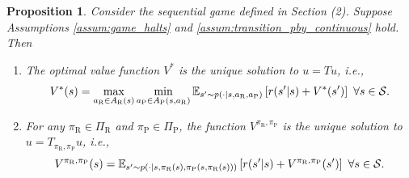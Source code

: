 \documentclass[aoas]{imsart}
\theoremstyle{plain}
\newtheorem{proposition}[theorem]{Proposition}
\theoremstyle{definition}
\begin{document}
       \begin{proposition}
           \label{lem:bellman_equations}
           Consider the sequential game defined in Section (2). Suppose Assumptions \ref{assum:game_halts} and \ref{assum:transition_pby_continuous} hold. Then
           \begin{enumerate}%
               \item The optimal value function $V^*$ is the unique solution to $u = Tu$, i.e., 
           \begingroup
           \allowdisplaybreaks
           \begin{equation}
               \label{eqn:bellman_equation}
               V^*(s) = \max_{a_\text{R} \in A_\text{R}(s)}\min_{a_\text{P} \in A_\text{P}(s,a_\text{R})}\mathbb{E}_{s' \sim p(\cdot|s,a_\text{R},a_\text{P})}\left[r(s'|s) + V^*(s')\right] \ \forall s \in {\cal S}.
           \end{equation}
           \endgroup
           \item For any $\pi_\text{R} \in \Pi_\text{R}$ and $\pi_\text{P} \in \Pi_\text{P}$, the function $V^{\pi_\text{R},\pi_\text{P}}$ is the unique solution to $u = T_{\pi_\text{R},\pi_\text{P}}u$, i.e., 
           \begingroup
           \allowdisplaybreaks
           \begin{equation}
           \label{eqn:bellman_eval}
               V^{\pi_\text{R},\pi_\text{P}}(s) =   \mathbb{E}_{s' \sim p(\cdot|s,\pi_\text{R}(s),\pi_\text{P}(s,\pi_\text{R}(s)))}\left[r(s'|s) + V^{\pi_\text{R},\pi_\text{P}}(s')\right] \ \forall s \in {\cal S}.          
           \end{equation}
           \endgroup
           \end{enumerate}
       \end{proposition}
\end{document}
